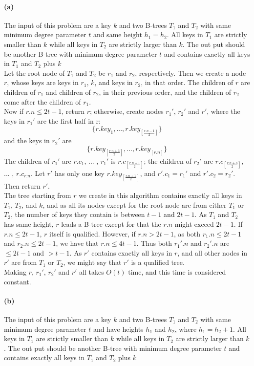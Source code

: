 \documentclass{6046}
\author{Lingfu Zhang}
\begin{document}
\paragraph{(a)}
The input of this problem are 
a key $k$ and two B-trees 
$T_1$ and $T_2$ with same minimum degree parameter $t$ 
and same height $h_1=h_2$. 
All keys in $T_1$ are strictly smaller than $k$
 while all keys in $T_2$ are strictly larger than $k$. 
The out put should be another 
B-tree with minimum degree parameter $t$ 
and contains exactly all 
keys in $T_1$ and $T_2$ plus $k$
\\

Let the root node of $T_1$ and $T_2$ 
be $r_1$ and $r_2$, respectively. 
Then we create a node $r$, 
whose keys are keys in $r_1$, 
$k$, 
and keys in $r_2$, in that order. 
The children of $r$ are children of $r_1$ and 
children of $r_2$, in their previous order, 
and the children of $r_2$ come after 
the children of $r_1$. 
\\
Now if $r.n \leq 2t-1$, return $r$; 
otherwise, create nodes 
$r_1'$, $r_2'$ and $r'$, 
where the keys in $r_1'$ are the first half in r:   
$$\{ r.key_1, ... , r.key_{[\frac{r.n-1}{2}]} \}$$
and the keys in $r_2'$ are  
$$\{ r.key_{[\frac{r.n+3}{2}]}, ... , r.key_{[r.n]} \}$$
The children of $r_1'$ are $r.c_1$, ... ,  
$r_1'$ is $r.c_{[\frac{r.n+1}{2}]}$;  
the children of $r_2'$ are $r.c_{[\frac{r.n+3}{2}]}$, ... , 
$r.c_{r.n}$. 
Let $r'$ has only one key $r.key_{[\frac{r.n+1}{2}]}$, 
and $r'.c_1 = r_1'$ and $r'.c_2 = r_2'$. 
Then return $r'$. 
\\

The tree starting from $r$ we create in this algorithm 
contains exactly all keys 
in $T_1$, $T_2$, and $k$, 
and as all its nodes except for the root node 
are from either $T_1$ or $T_2$, 
the number of keys they contain is between 
$t-1$ and $2t-1$. 
As $T_1$ and $T_2$ has same height, 
$r$ leads a B-tree except for that 
the $r.n$ might exceed $2t-1$. 
If $r.n \leq 2t-1$, $r$ itself is qualified. 
However, if $r.n > 2t-1$, as 
both $r_1.n \leq 2t-1$ and $r_2.n \leq 2t-1$, 
we have that $r.n \leq 4t-1$. 
Thus both $r_1'.n$ and $r_2'.n$ 
are $\leq 2t-1$ and $> t-1$. 
As $r'$ contains exactly all keys in $r$, 
and all other nodes in $r'$ are from $T_1$ or $T_2$, 
we might say that $r'$ is a qualified tree. 
\\

Making $r$, $r_1'$, $r_2'$ and $r'$ all takes 
$O(t)$ time, and this time is considered constant. 

\paragraph{(b)}
The input of this problem are 
a key $k$ and two B-trees 
$T_1$ and $T_2$ with same minimum degree parameter $t$ 
and have heights $h_1$ and $h_2$, where $h_1 = h_2+1$. 
All keys in $T_1$ are strictly smaller than $k$
 while all keys in $T_2$ are strictly larger than $k$. 
The out put should be another 
B-tree with minimum degree parameter $t$ 
and contains exactly all 
keys in $T_1$ and $T_2$ plus $k$
\\
\end{document}
